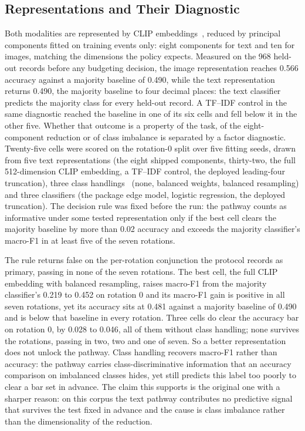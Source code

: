 \documentclass[conference,a4paper]{IEEEtran}
\begin{document}
\subsection{Representations and Their Diagnostic}
\label{sec:repr}
Both modalities are represented by CLIP embeddings~\cite{clip}, reduced by principal components fitted on training events only: eight components for text and ten for images, matching the dimensions the policy expects. Measured on the 968 held-out records before any budgeting decision, the image representation reaches 0.566 accuracy against a majority baseline of 0.490, while the text representation returns 0.490, the majority baseline to four decimal places: the text classifier predicts the majority class for every held-out record. A TF--IDF control in the same diagnostic reached the baseline in one of its six cells and fell below it in the other five. Whether that outcome is a property of the task, of the eight-component reduction or of class imbalance is separated by a factor diagnostic. Twenty-five cells were scored on the rotation-0 split over five fitting seeds, drawn from five text representations (the eight shipped components, thirty-two, the full 512-dimension CLIP embedding, a TF--IDF control, the deployed leading-four truncation), three class handlings~\cite{imbalance} (none, balanced weights, balanced resampling) and three classifiers (the package edge model, logistic regression, the deployed truncation). The decision rule was fixed before the run: the pathway counts as informative under some tested representation only if the best cell clears the majority baseline by more than 0.02 accuracy and exceeds the majority classifier's macro-F1 in at least five of the seven rotations.

The rule returns false on the per-rotation conjunction the protocol records as primary, passing in none of the seven rotations. The best cell, the full CLIP embedding with balanced resampling, raises macro-F1 from the majority classifier's 0.219 to 0.452 on rotation 0 and its macro-F1 gain is positive in all seven rotations, yet its accuracy sits at 0.481 against a majority baseline of 0.490 and is below that baseline in every rotation. Three cells do clear the accuracy bar on rotation 0, by 0.028 to 0.046, all of them without class handling; none survives the rotations, passing in two, two and one of seven. So a better representation does not unlock the pathway. Class handling recovers macro-F1 rather than accuracy: the pathway carries class-discriminative information that an accuracy comparison on imbalanced classes hides, yet still predicts this label too poorly to clear a bar set in advance. The claim this supports is the original one with a sharper reason: on this corpus the text pathway contributes no predictive signal that survives the test fixed in advance and the cause is class imbalance rather than the dimensionality of the reduction.
\end{document}
